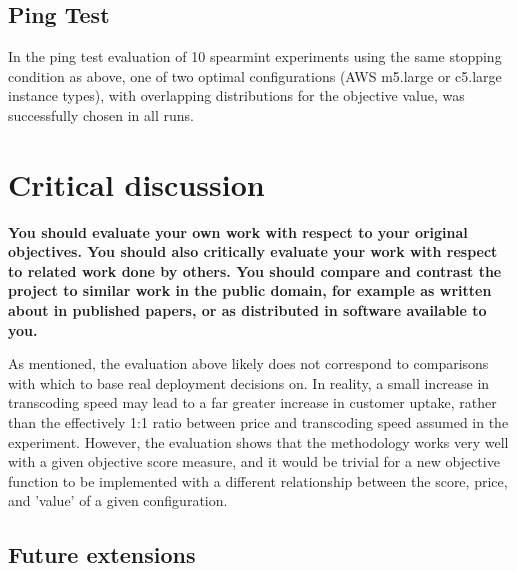 \documentclass{article}
\begin{document}

\subsection{Ping Test}
In the ping test evaluation of 10 spearmint experiments using the same stopping condition as above, one of two optimal configurations (AWS m5.large or c5.large instance types), with overlapping distributions for the objective value, was successfully chosen in all runs.

\section{Critical discussion}
\textbf{You should evaluate your own work with respect to your
original objectives. You should also critically evaluate
your work with respect to related work done by others.
You should compare and contrast the project to similar
work in the public domain, for example as written about
in published papers, or as distributed in software available to you. }

As mentioned, the evaluation above likely does not correspond to comparisons with which to base real deployment decisions on. In reality, a small increase in transcoding speed may lead to a far greater increase in customer uptake, rather than the effectively 1:1 ratio between price and transcoding speed assumed in the experiment. However, the evaluation shows that the methodology works very well with a given objective score measure, and it would be trivial for a new objective function to be implemented with a different relationship between the score, price, and 'value' of a given configuration.
\subsection{Future extensions}
\end{document}
